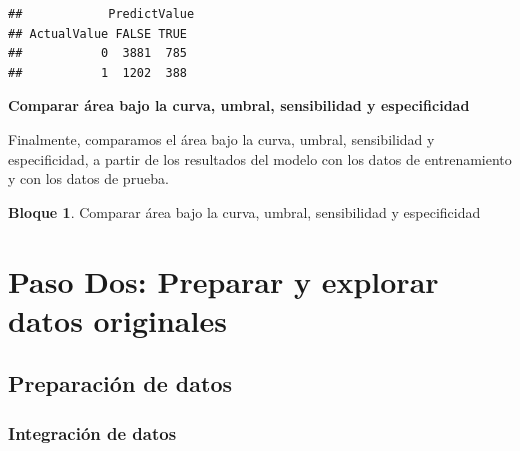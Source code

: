 \documentclass[]{book}
\newenvironment{Shaded}{\begin{snugshade}}{\end{snugshade}}
\newcommand{\NormalTok}[1]{#1}
\newcommand{\OperatorTok}[1]{\textcolor[rgb]{0.81,0.36,0.00}{\textbf{#1}}}
\newcommand{\StringTok}[1]{\textcolor[rgb]{0.31,0.60,0.02}{#1}}
\theoremstyle{definition}
\theoremstyle{definition}
\newtheorem{example}{Bloque}[chapter]
\theoremstyle{definition}
\theoremstyle{definition}
\theoremstyle{remark}
\begin{document}
\begin{verbatim}
##            PredictValue
## ActualValue FALSE TRUE
##           0  3881  785
##           1  1202  388
\end{verbatim}

\textbf{Comparar área bajo la curva, umbral, sensibilidad y especificidad}

Finalmente, comparamos el área bajo la curva, umbral, sensibilidad y especificidad, a partir de los resultados del modelo con los datos de entrenamiento y con los datos de prueba.

\begin{example}
\protect\hypertarget{exm:bloque25nbm}{}{\label{exm:bloque25nbm} }Comparar área bajo la curva, umbral, sensibilidad y especificidad
\end{example}

\begin{Shaded}
\end{Shaded}

\hypertarget{paso-dos-preparar-y-explorar-datos-originales}{%
\section{Paso Dos: Preparar y explorar datos originales}\label{paso-dos-preparar-y-explorar-datos-originales}}

\hypertarget{preparaciuxf3n-de-datos}{%
\subsection{Preparación de datos}\label{preparaciuxf3n-de-datos}}

\hypertarget{integraciuxf3n-de-datos}{%
\subsubsection{Integración de datos}\label{integraciuxf3n-de-datos}}
\end{document}
